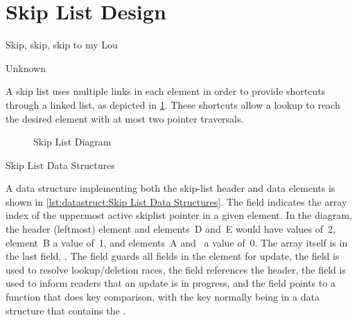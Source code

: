 \section{Skip List Design}
\label{sec:skiplist:Skip List Design}
%
\epigraph{Skip, skip, skip to my Lou}
	 {Unknown}

A skip list uses multiple links in each element in order to
provide shortcuts through a linked list, as depicted in
\cref{fig:datastruct:Skip List Diagram}.
These shortcuts allow a lookup to reach the desired element with
at most two pointer traversals.

\begin{figure}
\centering
{}
\caption{Skip List Diagram}
\label{fig:datastruct:Skip List Diagram}
\end{figure}

\begin{listing}

\caption{Skip List Data Structures}
\label{lst:datastruct:Skip List Data Structures}
\end{listing}

A data structure implementing both the skip-list header and data
elements is shown in
\cref{lst:datastruct:Skip List Data Structures}.
The  field indicates the array index of the uppermost
active skiplist pointer in a given element.
In the diagram, the header (leftmost) element and elements~D and~E
would have  values of~2, element~B a value of~1,
and elements~A and~ a value of~0.
The array itself is in the last field, .
The  field guards all fields in the element for update,
the  field is used to resolve lookup/deletion races,
the  field references the header,
the  field is used to inform readers that an update is in
progress,
and the  field points to a function that does key
comparison, with the key normally being in a data structure that contains
the .

